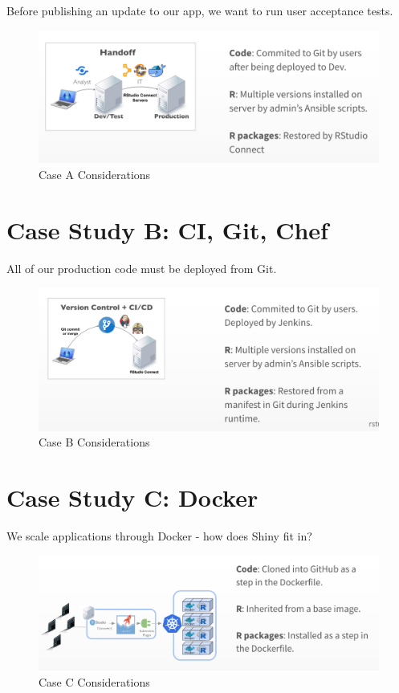 \documentclass[]{book}
\theoremstyle{definition}
\theoremstyle{definition}
\theoremstyle{definition}
\theoremstyle{remark}
\begin{document}
Before publishing an update to our app, we want to run user acceptance
tests.

\begin{figure}
\centering
\includegraphics{imgs/case-studies/case-a.png}
\caption{Case A Considerations}
\end{figure}

\hypertarget{case-study-b-ci-git-chef}{%
\section{Case Study B: CI, Git, Chef}\label{case-study-b-ci-git-chef}}

All of our production code must be deployed from Git.

\begin{figure}
\centering
\includegraphics{imgs/case-studies/case-b.png}
\caption{Case B Considerations}
\end{figure}

\hypertarget{case-study-c-docker}{%
\section{Case Study C: Docker}\label{case-study-c-docker}}

We scale applications through Docker - how does Shiny fit in?

\begin{figure}
\centering
\includegraphics{imgs/case-studies/case-c.png}
\caption{Case C Considerations}
\end{figure}
\end{document}
